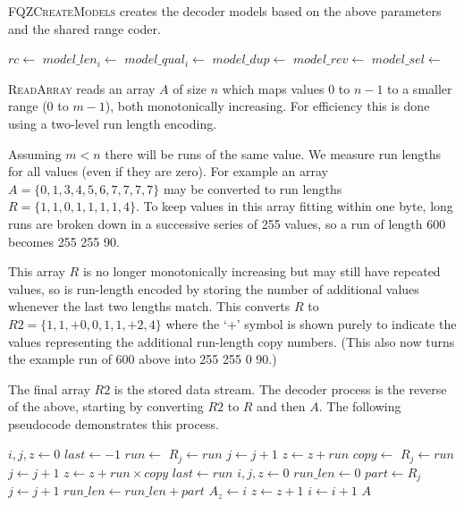 \documentclass[a4paper]{article}
\begin{document}
\textsc{FQZCreateModels} creates the decoder models based on the above
parameters and the shared range coder.

\begin{program}[H]
\begin{algorithmic}[1]
  \State $rc \gets $
    \State $model\_len_i \gets $
  \EndFor
    \State $model\_qual_i \gets $
  \EndFor
  \State $model\_dup \gets $
  \State $model\_rev \gets $
    \State $model\_sel \gets $
  \EndIf
\EndProcedure
\end{algorithmic}
\end{program}

\textsc{ReadArray} reads an array $A$ of size $n$ which maps values 0
to $n-1$ to a smaller range (0 to $m-1$), both monotonically
increasing.  For efficiency this is done using a two-level run length
encoding.

Assuming $m < n$ there will be runs of the same value.  We measure run
lengths for all values (even if they are zero).  For example an array
$A = \{0,1,3,4,5,6,7,7,7,7\}$ may be converted to run lengths $R =
\{1,1,0,1,1,1,1,4\}$.  To keep values in this array fitting within one
byte, long runs are broken down in a successive series of 255 values,
so a run of length 600 becomes 255 255 90.

This array $R$ is no longer monotonically increasing but may still
have repeated values, so is run-length encoded by storing the number
of additional values whenever the last two lengths match.  This
converts $R$ to $R2 = \{1, 1, +0, 0, 1, 1, +2, 4\}$ where the `+'
symbol is shown purely to indicate the values representing the
additional run-length copy numbers.  (This also now turns the example
run of 600 above into 255 255 0 90.)

The final array $R2$ is the stored data stream.  The decoder process
is the reverse of the above, starting by converting $R2$ to $R$ and
then $A$.  The following pseudocode demonstrates this process.

\begin{algorithmic}[1]
\State $i,j,z \gets 0$
\State $last \gets -1$
 
  \State $run \gets $ 
  \State $R_j \gets run$
  \State $j \gets j+1$
  \State $z \gets z + run$
    \State $copy \gets $ 
      \State $R_j \gets run$
      \State $j \gets j+1$
    \EndFor
    \State $z \gets z + run \times copy$
  \EndIf
  \State $last \gets run$
\EndWhile
\Statex
\State $i,j,z \gets 0$
 
  \State $run\_len \gets 0$
  \Repeat
    \State $part \gets R_j$
    \State $j \gets j + 1$
    \State $run\_len \gets run\_len + part$
    \State $A_z \gets i$
    \State $z \gets z+1$
  \EndFor
  \State $i \gets i+1$
\EndWhile
\Statex
\State \Return $A$
\EndFunction
\end{algorithmic}
\end{document}
